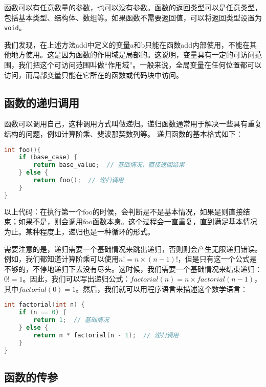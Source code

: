 \documentclass[../main.tex]{subfiles}
\begin{document}
函数可以有任意数量的参数，也可以没有参数。函数的返回类型可以是任意类型，包括基本类型、结构体、数组等。如果函数不需要返回值，可以将返回类型设置为\texttt{void}。

我们发现，在上述方法add中定义的变量a和b只能在函数add内部使用，不能在其他地方使用。这是因为函数的作用域是局部的。这说明，变量具有一定的可访问范围，我们把这个可访问范围叫做“作用域”。一般来说，全局变量在任何位置都可以访问，而局部变量只能在它所在的函数或代码块中访问。

\subsection{函数的递归调用}

函数可以调用自己，这种调用方式叫做递归。递归函数通常用于解决一些具有重复结构的问题，例如计算阶乘、斐波那契数列等。
递归函数的基本格式如下：
\begin{lstlisting}[language=C++]
int foo(){
    if (base_case) {
        return base_value;  // 基础情况，直接返回结果
    } else {
        return foo();  // 递归调用
    }
}
\end{lstlisting}

以上代码：在执行第一个foo的时候，会判断是不是基本情况，如果是则直接结束；如果不是，则会调用foo函数本身。这个过程会一直重复，直到满足基本情况为止。某种程度上，递归也是一种循环的形式。

需要注意的是，递归需要一个基础情况来跳出递归，否则则会产生无限递归错误。例如，我们都知道计算阶乘可以使用$n!=n\times(n-1)!$，但是只有这一个公式是不够的，不停地递归下去没有尽头。这时候，我们需要一个基础情况来结束递归：$0!=1$。因此，我们可以写出递归公式：$factorial(n) = n \times factorial(n-1)$，其中$factorial(0) = 1$。然后，我们就可以用程序语言来描述这个数学语言：
\begin{lstlisting}[language=C++]
int factorial(int n) {
    if (n == 0) {
        return 1;  // 基础情况
    } else {
        return n * factorial(n - 1);  // 递归调用
    }
}
\end{lstlisting}

\subsection{函数的传参}
\end{document}

